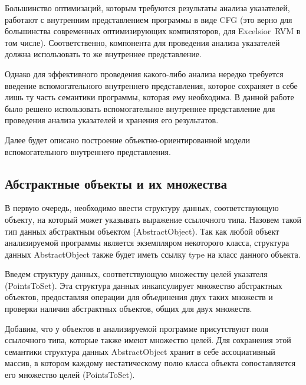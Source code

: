 \documentclass[14pt,titlepage]{extarticle}
\newcommand{\eng}[1]{{\English#1}}
\begin{document}
    Большинство оптимизаций, которым требуются результаты анализа указателей,
    работают с внутренним представлением программы в виде CFG (это верно для
    большинства современных оптимизирующих компиляторов, для
    \eng{Excelsior~RVM} в том числе). Соответственно, компонента для проведения
    анализа указателей должна использовать то же внутреннее представление.

    Однако для эффективного проведения какого-либо анализа нередко требуется
    введение вспомогательного внутреннего представления, которое сохраняет в
    себе лишь ту часть семантики программы, которая ему необходима.
    В данной работе было решено использовать вспомогательное внутреннее
    представление для проведения анализа указателей и хранения его результатов.

    Далее будет описано построение объектно-ориентированной модели
    вспомогательного внутреннего представления.

    \subsection{Абстрактные объекты и их множества}

      В первую очередь, необходимо ввести структуру данных, соответствующую
      объекту, на который может указывать выражение ссылочного типа. Назовем
      такой тип данных абстрактным объектом (\eng{AbstractObject}). Так как
      любой объект анализируемой программы является экземпляром некоторого
      класса, структура данных \eng{AbstractObject} также будет иметь ссылку
      \eng{type} на класс данного объекта.

      Введем структуру данных, соответствующую множеству целей указателя
      (\eng{Points\-To\-Set}). Эта структура данных инкапсулирует
      множество абстрактных объектов, предоставляя операции для объединения двух
      таких множеств и проверки наличия абстрактных объектов, общих для двух
      множеств.

      Добавим, что у объектов в анализируемой программе присутствуют поля
      ссылочного типа, которые также имеют множество целей. Для сохранения
      этой семантики структура данных \eng{AbstractObject} хранит в себе
      ассоциативный массив, в котором каждому нестатическому полю класса объекта
      сопоставляется его множество целей (\eng{PointsToSet}).
\end{document}
